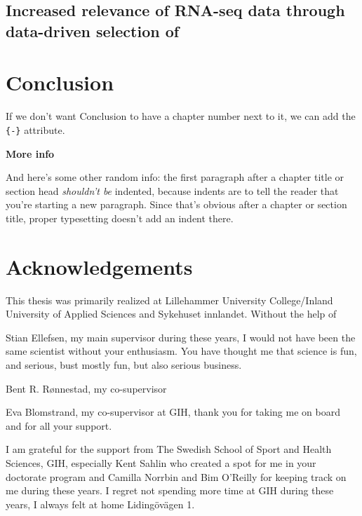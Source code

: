 \documentclass[twoside,10pt]{gihclass} %
\begin{document}
\hypertarget{increased-relevance-of-rna-seq-data-through-data-driven-selection-of}{%
\section{Increased relevance of RNA-seq data through data-driven selection of}\label{increased-relevance-of-rna-seq-data-through-data-driven-selection-of}}

\hypertarget{conclusion}{%
\chapter*{Conclusion}\label{conclusion}}

If we don't want Conclusion to have a chapter number next to it, we can add the \texttt{\{-\}} attribute.

\textbf{More info}

And here's some other random info: the first paragraph after a chapter title or section head \emph{shouldn't be} indented, because indents are to tell the reader that you're starting a new paragraph. Since that's obvious after a chapter or section title, proper typesetting doesn't add an indent there.

\hypertarget{acknowledgements}{%
\chapter{Acknowledgements}\label{acknowledgements}}

This thesis was primarily realized at Lillehammer University College/Inland University of Applied Sciences and Sykehuset innlandet. Without the help of

Stian Ellefsen, my main supervisor during these years, I would not have been the same scientist without your enthusiasm. You have thought me that science is fun, and serious, bust mostly fun, but also serious business.

Bent R. Rønnestad, my co-supervisor

Eva Blomstrand, my co-supervisor at GIH, thank you for taking me on board and for all your support.

I am grateful for the support from The Swedish School of Sport and Health
Sciences, GIH, especially Kent Sahlin who created a spot for me in your doctorate program and Camilla Norrbin and Bim O'Reilly for keeping track on me during these years. I regret not spending more time at GIH during these years, I always felt at home Lidingövägen 1.
\end{document}
